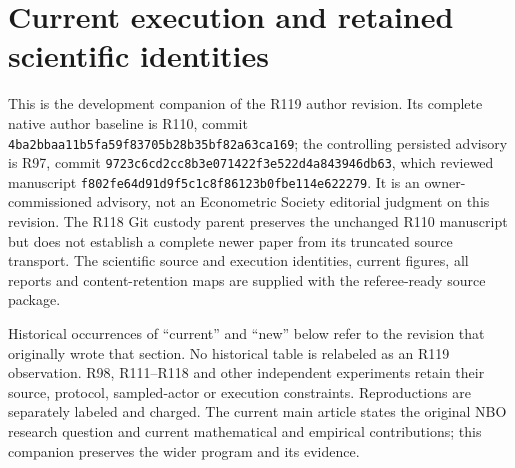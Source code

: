 \section{Current execution and retained scientific identities}\label{dev:custody119}
This is the development companion of the R119 author revision. Its complete
native author baseline is R110, commit
\nolinkurl{4ba2bbaa11b5fa59f83705b28b35bf82a63ca169}; the controlling persisted
advisory is R97, commit \nolinkurl{9723c6cd2cc8b3e071422f3e522d4a843946db63},
which reviewed manuscript \nolinkurl{f802fe64d91d9f5c1c8f86123b0fbe114e622279}.
It is an owner-commissioned advisory, not an Econometric Society editorial
judgment on this revision. The R118 Git custody parent preserves the unchanged
R110 manuscript but does not establish a complete newer paper from its
truncated source transport. The scientific source and execution identities,
current figures, all reports and content-retention maps are supplied with the
referee-ready source package.

Historical occurrences of ``current'' and ``new'' below refer to the revision
that originally wrote that section. No historical table is relabeled as an
R119 observation. R98, R111--R118 and other independent experiments retain
their source, protocol, sampled-actor or execution constraints. Reproductions
are separately labeled and charged. The current main article states the
original NBO research question and current mathematical and empirical
contributions; this companion preserves the wider program and its evidence.

